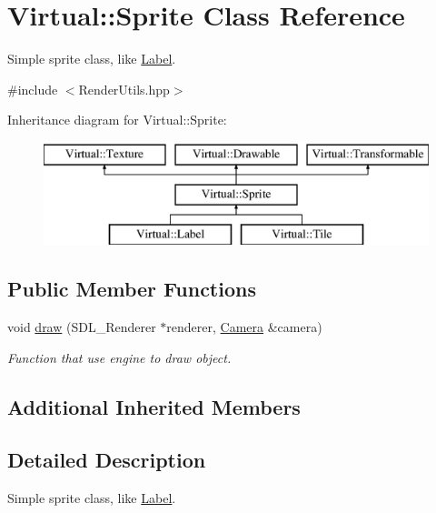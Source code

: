 \hypertarget{class_virtual_1_1_sprite}{}\section{Virtual\+:\+:Sprite Class Reference}
\label{class_virtual_1_1_sprite}


Simple sprite class, like \hyperlink{class_virtual_1_1_label}{Label}.  




{\ttfamily \#include $<$Render\+Utils.\+hpp$>$}

Inheritance diagram for Virtual\+:\+:Sprite\+:\begin{figure}[H]
\begin{center}
\leavevmode
\includegraphics[height=3.000000cm]{class_virtual_1_1_sprite}
\end{center}
\end{figure}
\subsection*{Public Member Functions}
\begin{DoxyCompactItemize}
\item 
void \hyperlink{class_virtual_1_1_sprite_a57f581e0307ab2b2dd7c6922dba2a057}{draw} (S\+D\+L\+\_\+\+Renderer $\ast$renderer, \hyperlink{class_virtual_1_1_camera}{Camera} \&camera)
\begin{DoxyCompactList}\small\item\em Function that use engine to draw object. \end{DoxyCompactList}\end{DoxyCompactItemize}
\subsection*{Additional Inherited Members}


\subsection{Detailed Description}
Simple sprite class, like \hyperlink{class_virtual_1_1_label}{Label}. 

